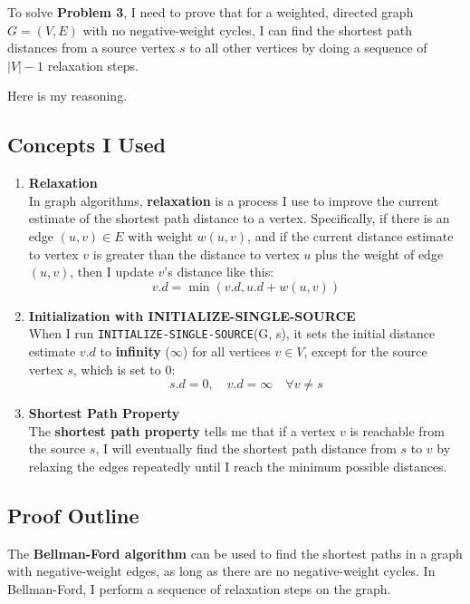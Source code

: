 \documentclass[10pt,letter,notitlepage]{article}
\begin{document}
\begin{Answer}

To solve \textbf{Problem 3}, I need to prove that for a weighted, directed graph \( G = (V, E) \) with no negative-weight cycles, I can find the shortest path distances from a source vertex \( s \) to all other vertices by doing a sequence of \( |V| - 1 \) relaxation steps.

Here is my reasoning.

\subsection*{Concepts I Used}

\begin{enumerate}
    \item \textbf{Relaxation} \\
    In graph algorithms, \textbf{relaxation} is a process I use to improve the current estimate of the shortest path distance to a vertex. Specifically, if there is an edge \( (u, v) \in E \) with weight \( w(u, v) \), and if the current distance estimate to vertex \( v \) is greater than the distance to vertex \( u \) plus the weight of edge \( (u, v) \), then I update \( v \)’s distance like this:
    \[
    v.d = \min(v.d, u.d + w(u, v))
    \]

    \item \textbf{Initialization with INITIALIZE-SINGLE-SOURCE} \\
    When I run \texttt{INITIALIZE-SINGLE-SOURCE}(G, s), it sets the initial distance estimate \( v.d \) to \textbf{infinity} (\(\infty\)) for all vertices \( v \in V \), except for the source vertex \( s \), which is set to 0:
    \[
    s.d = 0, \quad v.d = \infty \quad \forall v \neq s
    \]

    \item \textbf{Shortest Path Property} \\
    The \textbf{shortest path property} tells me that if a vertex \( v \) is reachable from the source \( s \), I will eventually find the shortest path distance from \( s \) to \( v \) by relaxing the edges repeatedly until I reach the minimum possible distances.
\end{enumerate}

\subsection*{Proof Outline}

The \textbf{Bellman-Ford algorithm} can be used to find the shortest paths in a graph with negative-weight edges, as long as there are no negative-weight cycles. In Bellman-Ford, I perform a sequence of relaxation steps on the graph.


\end{Answer}
\end{document}
